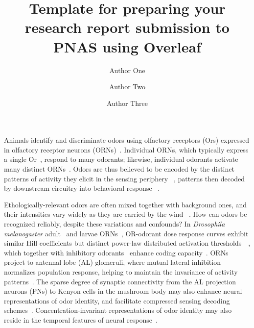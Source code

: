 \documentclass[9pt,twocolumn,twoside,lineno]{pnas-new}
\title{Template for preparing your research report submission to PNAS using Overleaf}
\author[a,c,1]{Author One}
\author[b,1,2]{Author Two}
\author[a]{Author Three}
\affil[a]{Affiliation One}
\affil[b]{Affiliation Two}
\affil[c]{Affiliation Three}
\begin{document}
%
%



Animals identify and discriminate odors using olfactory receptors (Ors) expressed in olfactory receptor neurons (ORNs)~\cite{Or_ORNs_maps, buck1991novel}. Individual ORNs, which typically express a single Or~\cite{buck1991novel}, respond to many odorants; likewise, individual odorants activate many distinct ORNs~\cite{friedrich1997combinatorial,hallem_carlson,mosquito_combinatorial_coding,nara2011large}. Odors are  thus believed to be encoded by the distinct patterns of activity they elicit in the sensing periphery
~\cite{malnic1999combinatorial, mosquito_combinatorial_coding, hildebrand1997mechanisms, hallem_carlson, debryune_odor_coding, friedrich1997combinatorial}, patterns then decoded by downstream circuitry into behavioral response ~\cite{early_olfactory_processing}. 

Ethologically-relevant odors are often mixed together with background ones, and their intensities vary widely as they are carried by the wind ~\cite{odor_backgrounds, murlis_odor_plumes, fluid_dynamics_chemosensory, celani, carde_navigation,celani,srinivas_elife}. How can odors be recognized reliably, despite these variations and confounds? In \textit{Drosophila melanogaster} adult~\cite{hallem_carlson,srinivas_elife} and larvae ORNs~\cite{si2017invariances}, OR-odorant dose response curves exhibit similar Hill coefficients but distinct power-law distributed activation thresholds~\cite{hallem_carlson}~\cite{si2017invariances}, which together with inhibitory odorants~\cite{Cao_Tu_WL} enhance coding capacity~\cite{si2017invariances, Cao_Tu_WL, hallem_carlson}. ORNs project to antennal lobe (AL) glomeruli, where mutual lateral inhibition normalizes population response, helping to maintain the invariance of activity patterns~\cite{lateral_inh_asahina, divisive_normalization}. The sparse degree of synaptic connectivity from the AL projection neurons (PNs) to Kenyon cells in the mushroom body may also enhance neural representations of odor identity, and facilitate compressed sensing decoding schemes~\cite{abbott_axel, litwinkumar, vijay_1}. Concentration-invariant representations of odor identity may also reside in the temporal features of neural response~\cite{stopfer_nat_neuro, stopfer_temporal_model, stopfer_temporal_channel, primacy_coding}. 
\end{document}

